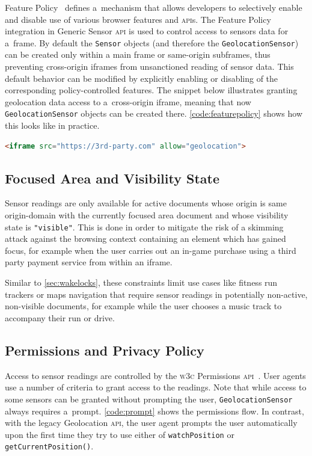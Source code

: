 \documentclass[sigconf,hyphens]{acmart}
\begin{document}
Feature Policy~\cite{clelland2019featurepolicy} defines a~mechanism that allows developers
to selectively enable and disable use of various browser features and \textsc{api}s.
The Feature Policy integration in Generic Sensor \textsc{api}
is used to control access to sensors data for a~frame.
By default the \texttt{Sensor} objects (and therefore the \texttt{GeolocationSensor})
can be created only within a main frame or same-origin subframes,
thus preventing cross-origin iframes from unsanctioned reading of sensor data.
This default behavior can be modified by explicitly enabling or disabling
of the corresponding policy-controlled features.
The snippet below illustrates granting geolocation data access to a~cross-origin iframe,
meaning that now \texttt{GeolocationSensor} objects can be created there.
\autoref{code:featurepolicy} shows how this looks like in practice.

\begin{lstlisting}[caption={Allowing an iframe to use \texttt{GeolocationSensor}},
  label=code:featurepolicy, language=HTML, float=h] 
<iframe src="https://3rd-party.com" allow="geolocation">
\end{lstlisting}

\subsection{Focused Area and Visibility State}
\label{sec:focusandvisibility}

Sensor readings are only available for active documents whose origin is same origin-domain
with the currently focused area document and whose visibility state is \texttt{"visible"}.
This is done in order to mitigate the risk of a skimming attack
against the browsing context containing an element which has gained focus,
for example when the user carries out an in-game purchase using a third party payment service
from within an iframe.

Similar to \autoref{sec:wakelocks}, these constraints limit use cases like fitness run trackers
or maps navigation that require sensor readings in potentially non-active, non-visible documents,
for example while the user chooses a music track to accompany their run or drive.

\subsection{Permissions and Privacy Policy}

Access to sensor readings are controlled by the \textsc{w3c} Permissions
\textsc{api}~\cite{lamouri2017permissions}.
User agents use a number of criteria to grant access to the readings.
Note that while access to some sensors can be granted without prompting the user,
\texttt{GeolocationSensor} always requires a~prompt.
\autoref{code:prompt} shows the permissions flow.
In contrast, with the legacy Geolocation \textsc{api}, the user agent prompts the user automatically
upon the first time they try to use either of \texttt{watchPosition} or \texttt{getCurrentPosition()}.
\end{document}

